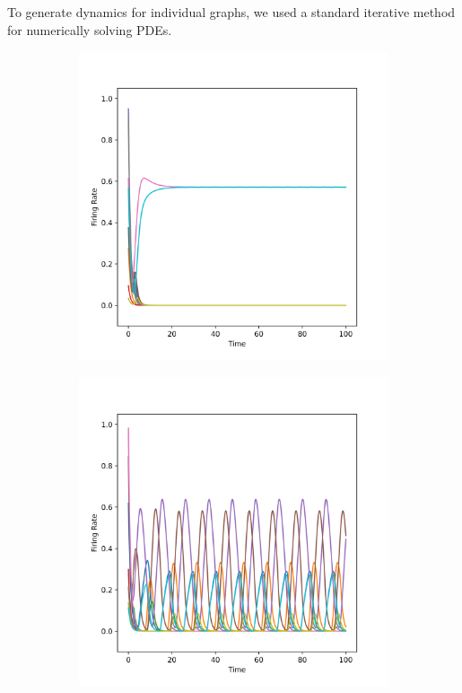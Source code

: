 To generate dynamics for individual graphs, we used a standard iterative method for numerically solving PDEs.
\begin{figure}[h]
     \centering
     \begin{subfigure}{0.45\textwidth}
         \centering
         \includegraphics[width=\linewidth]{./Figures/Matrix Size 10 Symmetry 0.100 0.6 0.1 12.png}
         \label{fig:1a}
     \end{subfigure}
     \begin{subfigure}{0.45\textwidth}
         \centering
         \includegraphics[width=\linewidth]{./Figures/Matrix Size 10 Symmetry 0.100 0.6 0.1 13.png}

\end{subfigure}
\end{figure}
